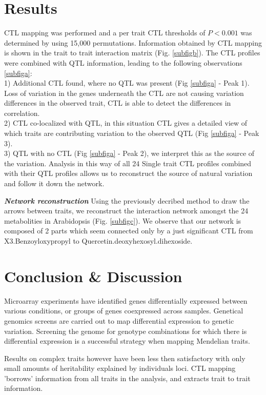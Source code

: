 \documentclass{bioinfo}
\begin{document}
\section{Results}
  CTL mapping was performed and a per trait CTL thresholds of $P < 0.001$ was 
  determined by using 15,000 permutations.
  Information obtained by CTL mapping is shown in the trait to trait interaction matrix (Fig. \ref{subfigb}).
  The CTL profiles were combined with QTL information, leading to the following observations \ref{subfiga}:\\
  1) Additional CTL found, where no QTL was present (Fig \ref{subfiga} - Peak 1). Loss of variation in the genes 
  underneath the CTL are not causing variation differences in the observed trait, CTL is able to 
  detect the differences in correlation.\\
  2) CTL co-localized with QTL, in this situation CTL gives a detailed view of which traits 
  are contributing variation to the observed QTL  (Fig \ref{subfiga} - Peak 3).\\
  3) QTL with no CTL  (Fig \ref{subfiga} - Peak 2), we interpret this as the source of the variation. Analysis in this way of 
  all 24 Single trait CTL profiles combined with their QTL profiles allows us to reconstruct the 
  source of natural variation and follow it down the network.

\emph{ {\bf Network reconstruction}}
  Using the previously decribed method to draw the arrows between traits, we reconstruct the interaction 
  network amongst the 24 metabolities in Arabidopsis (Fig. \ref{subfigc}). We observe that our network is 
  composed of 2 parts which seem connected only by a just significant CTL from X3.Benzoyloxypropyl to 
  Quercetin.deoxyhexosyl.dihexoside.

\section{Conclusion \& Discussion}
  Microarray experiments have identified genes differentially expressed between various 
  conditions, or groups of genes coexpressed across samples. Genetical genomics screens 
  are carried out to map differential expression to genetic variation. Screening 
  the genome for genotype combinations for which there is differential expression is 
  a successful strategy when mapping Mendelian traits. 
  
  Results on complex traits however have been less then satisfactory with only small 
  amounts of heritability explained by individuals loci. CTL mapping 'borrows'
  information from all traits in the analysis, and extracts trait to trait 
   information.
 
\end{document}

